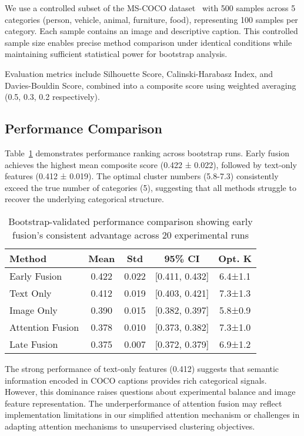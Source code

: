 \documentclass[sigconf]{acmart}
\begin{document}
We use a controlled subset of the MS-COCO dataset~\cite{lin2014microsoft} with 500 samples across 5 categories (person, vehicle, animal, furniture, food), representing 100 samples per category. Each sample contains an image and descriptive caption. This controlled sample size enables precise method comparison under identical conditions while maintaining sufficient statistical power for bootstrap analysis.

Evaluation metrics include Silhouette Score, Calinski-Harabasz Index, and Davies-Bouldin Score, combined into a composite score using weighted averaging (0.5, 0.3, 0.2 respectively).

\subsection{Performance Comparison}

Table~\ref{tab:performance} demonstrates performance ranking across bootstrap runs. Early fusion achieves the highest mean composite score (0.422 ± 0.022), followed by text-only features (0.412 ± 0.019). The optimal cluster numbers (5.8-7.3) consistently exceed the true number of categories (5), suggesting that all methods struggle to recover the underlying categorical structure.

\begin{table}[h!]
\centering
\small
\caption{Bootstrap-validated performance comparison showing early fusion's consistent advantage across 20 experimental runs}
\label{tab:performance}
\begin{tabular}{@{}lcccc@{}}
\toprule
\textbf{Method} & \textbf{Mean} & \textbf{Std} & \textbf{95\% CI} & \textbf{Opt. K} \\
\midrule
Early Fusion & 0.422 & 0.022 & [0.411, 0.432] & 6.4±1.1 \\
Text Only & 0.412 & 0.019 & [0.403, 0.421] & 7.3±1.3 \\
Image Only & 0.390 & 0.015 & [0.382, 0.397] & 5.8±0.9 \\
Attention Fusion & 0.378 & 0.010 & [0.373, 0.382] & 7.3±1.0 \\
Late Fusion & 0.375 & 0.007 & [0.372, 0.379] & 6.9±1.2 \\
\bottomrule
\end{tabular}
\end{table}

The strong performance of text-only features (0.412) suggests that semantic information encoded in COCO captions provides rich categorical signals. However, this dominance raises questions about experimental balance and image feature representation. The underperformance of attention fusion may reflect implementation limitations in our simplified attention mechanism or challenges in adapting attention mechanisms to unsupervised clustering objectives.
\end{document}
